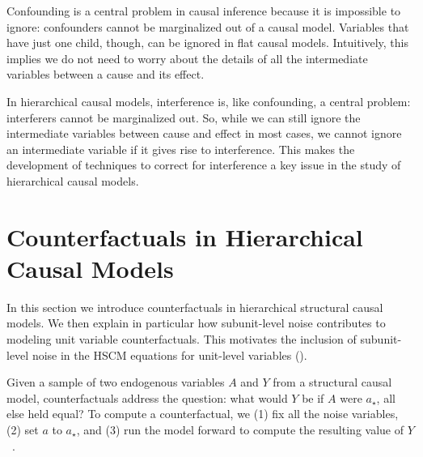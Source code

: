 \documentclass[12pt]{article}
\begin{document}
Confounding is a central problem in causal inference because it is impossible to ignore: confounders cannot be marginalized out of a causal model.
Variables that have just one child, though, can be ignored in flat causal models.
Intuitively, this implies we do not need to worry about the details of all the intermediate variables between a cause and its effect.

In hierarchical causal models, interference is, like confounding, a central problem: interferers cannot be marginalized out.
So, while we can still ignore the intermediate variables between cause and effect in most cases, we cannot ignore an intermediate variable if it gives rise to interference.
This makes the development of techniques to correct for interference a key issue in the study of hierarchical causal models. \section{Counterfactuals in Hierarchical Causal Models} \label{apx:counterfactuals}

In this section we introduce counterfactuals in hierarchical structural causal models.
We then explain in particular how subunit-level noise contributes to modeling unit variable counterfactuals. This motivates the inclusion of subunit-level noise in the HSCM equations for unit-level variables ().

Given a sample of two endogenous variables $A$ and $Y$ from a structural causal model, counterfactuals address the question: what would $Y$ be if $A$ were $a_\star$, all else held equal?
To compute a counterfactual, we (1) fix all the noise variables, (2) set $a$ to $a_\star$, and (3) run the model forward to compute the resulting value of $Y$~\citep[][Chap. 7]{Pearl2009-fh}.

\end{document}
